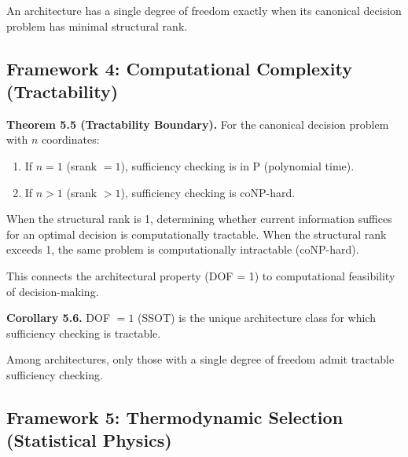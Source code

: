 \begin{informal}
An architecture has a single degree of freedom exactly when its canonical decision problem has minimal structural rank.
\end{informal}


\subsection{Framework 4: Computational Complexity (Tractability)}

\begin{formal}
\textbf{Theorem 5.5 (Tractability Boundary).} For the canonical decision problem with $n$ coordinates:
\begin{enumerate}
\item If $n = 1$ (srank $= 1$), sufficiency checking is in P (polynomial time).
\item If $n > 1$ (srank $> 1$), sufficiency checking is coNP-hard.
\end{enumerate}
\end{formal}

\begin{informal}
When the structural rank is 1, determining whether current information suffices for an optimal decision is computationally tractable. When the structural rank exceeds 1, the same problem is computationally intractable (coNP-hard).
\end{informal}


This connects the architectural property (DOF = 1) to computational feasibility of decision-making.

\begin{formal}
\textbf{Corollary 5.6.} DOF $= 1$ (SSOT) is the unique architecture class for which sufficiency checking is tractable.
\end{formal}

\begin{informal}
Among architectures, only those with a single degree of freedom admit tractable sufficiency checking.
\end{informal}


\subsection{Framework 5: Thermodynamic Selection (Statistical Physics)}

